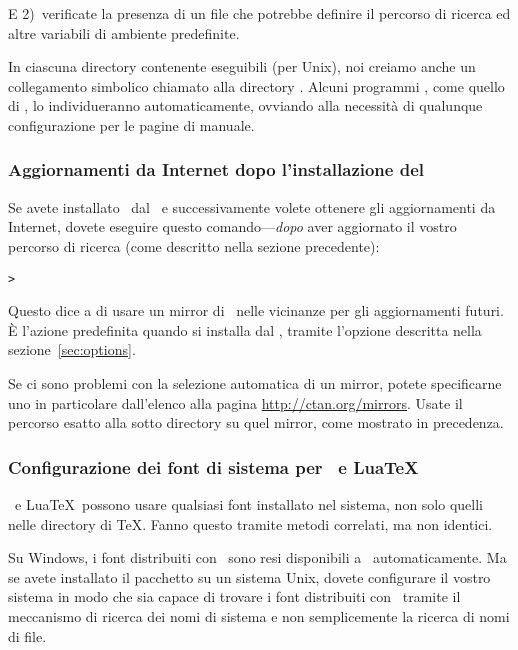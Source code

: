 \documentclass{article}
\begin{document}
E 2)~verificate la presenza di un file  che
potrebbe definire il percorso di ricerca ed altre variabili di ambiente
predefinite.

In ciascuna directory contenente eseguibili (per Unix), noi creiamo anche
un collegamento simbolico chiamato  alla directory
. Alcuni programmi , come quello di
\MacOSX, lo individueranno automaticamente, ovviando alla necessità di
qualunque configurazione per le pagine di manuale.


\subsubsection{Aggiornamenti da Internet dopo l'installazione del \DVD}
\label{sec:dvd-install-net-updates}

Se avete installato \TL\ dal \DVD\ e successivamente volete ottenere gli
aggiornamenti da Internet, dovete eseguire questo comando---\emph{dopo} aver
aggiornato il vostro percorso di ricerca (come descritto nella sezione
precedente):

\begin{alltt}
> 
\end{alltt}

Questo dice a  di usare un mirror di \CTAN\ nelle vicinanze
per gli aggiornamenti futuri. È l'azione predefinita quando si installa dal
\DVD, tramite l'opzione descritta nella sezione~\ref{sec:options}.

Se ci sono problemi con la selezione automatica di un mirror, potete
specificarne uno in particolare dall'elenco alla pagina
\url{http://ctan.org/mirrors}. Usate il percorso esatto alla sotto directory
 su quel mirror, come mostrato in precedenza.


\subsubsection{Configurazione dei font di sistema per \XeTeX\ e Lua\TeX}
\label{sec:font-conf-sys}

\XeTeX\ e Lua\TeX\ possono usare qualsiasi font installato nel sistema,
non solo quelli nelle directory di \TeX. Fanno questo tramite metodi
correlati, ma non identici.

Su Windows, i font distribuiti con \TL\ sono resi disponibili a \XeTeX\
automaticamente. Ma se avete installato il pacchetto  su
un sistema Unix, dovete configurare il vostro sistema in modo che sia
capace di trovare i font distribuiti con \TL\ tramite il meccanismo di
ricerca dei nomi di sistema e non semplicemente la ricerca di nomi di
file.
\end{document}

